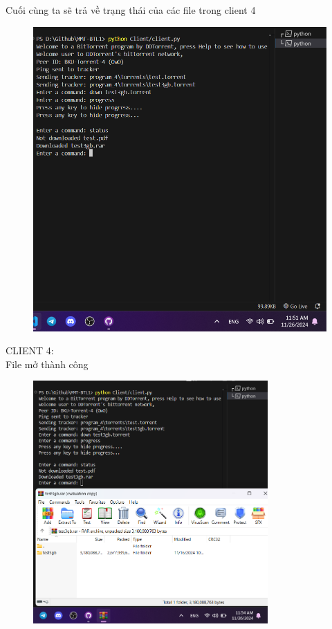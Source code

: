 \documentclass[a4paper]{article}
\begin{document}
Cuối cùng ta sẽ trả về trạng thái của các file trong client 4
\begin{figure}[H]
    \centering
    \includegraphics[width=1\textwidth]{images/23.png}
    \captionsetup{labelformat=empty}
\end{figure}
\indent CLIENT 4:\\
File mở thành công
\begin{figure}[H]
    \centering
    \includegraphics[width=0.8\textwidth]{images/24.png}
    \captionsetup{labelformat=empty}
\end{figure}
\end{document}
